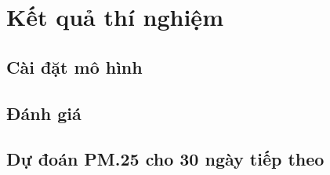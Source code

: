 \section{Kết quả thí nghiệm}
\subsection{Cài đặt mô hình}










\subsection{Đánh giá}



\subsection{Dự đoán PM.25 cho 30 ngày tiếp theo}












